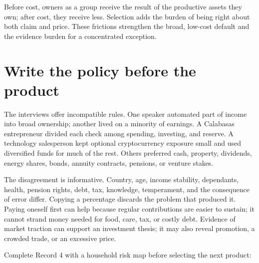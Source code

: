 Before cost, owners as a group receive the result of the productive assets they
own; after cost, they receive less. Selection adds the burden of being right
about both claim and price. These frictions strengthen the broad, low-cost
default and the evidence burden for a concentrated exception.

\section{Write the policy before the product}

The interviews offer incompatible rules. One speaker automated part of income
into broad ownership; another lived on a minority of earnings. A Calabasas
entrepreneur divided each check among spending, investing, and reserve. A
technology salesperson kept optional cryptocurrency exposure small and used
diversified funds for much of the rest. Others preferred cash, property,
dividends, energy shares, bonds, annuity contracts, pensions, or venture stakes.

The disagreement is informative. Country, age, income stability, dependants,
health, pension rights, debt, tax, knowledge, temperament, and the consequence
of error differ. Copying a percentage discards the problem that produced it.
Paying oneself first can help because regular contributions are easier to
sustain; it cannot strand money needed for food, care, tax, or costly debt.
Evidence of market
traction can support an investment thesis; it may also reveal promotion, a
crowded trade, or an excessive price.

\enlargethispage{\baselineskip}
Complete Record 4 with a household risk map before selecting the next product:

